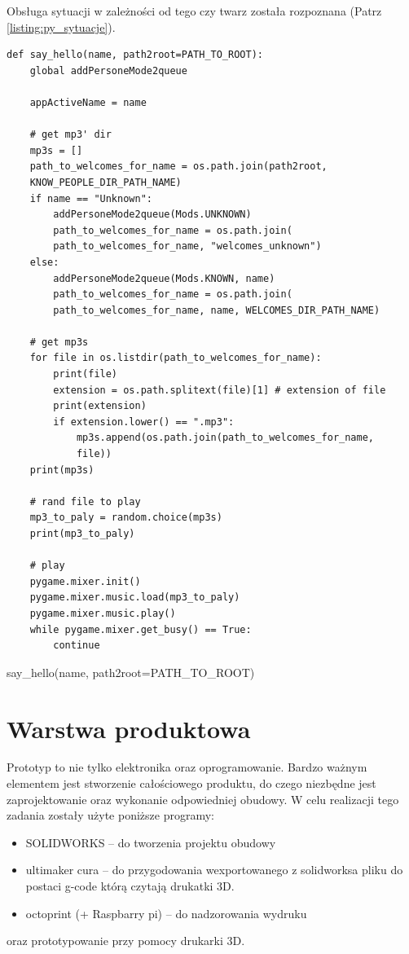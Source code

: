 \documentclass[a4paper,12pt,reqno]{article}
\begin{document}
\newpage
Obsługa sytuacji w zależności od tego czy twarz została rozpoznana  (Patrz \ref{listing:py_sytuacje}).
\begin{listing}[H]%
\begin{mdframed}[backgroundcolor=codebg]
\begin{verbatim}
def say_hello(name, path2root=PATH_TO_ROOT):
    global addPersoneMode2queue
    
    appActiveName = name
    
    # get mp3' dir
    mp3s = []
    path_to_welcomes_for_name = os.path.join(path2root, 
    KNOW_PEOPLE_DIR_PATH_NAME)
    if name == "Unknown":
        addPersoneMode2queue(Mods.UNKNOWN)
        path_to_welcomes_for_name = os.path.join(
        path_to_welcomes_for_name, "welcomes_unknown")
    else:
        addPersoneMode2queue(Mods.KNOWN, name)
        path_to_welcomes_for_name = os.path.join(
        path_to_welcomes_for_name, name, WELCOMES_DIR_PATH_NAME)
        
    # get mp3s
    for file in os.listdir(path_to_welcomes_for_name):
        print(file)
        extension = os.path.splitext(file)[1] # extension of file
        print(extension)
        if extension.lower() == ".mp3":
            mp3s.append(os.path.join(path_to_welcomes_for_name, 
            file))
    print(mp3s)        
        
    # rand file to play
    mp3_to_paly = random.choice(mp3s)
    print(mp3_to_paly)
    
    # play      
    pygame.mixer.init()
    pygame.mixer.music.load(mp3_to_paly)
    pygame.mixer.music.play()
    while pygame.mixer.get_busy() == True:
        continue
\end{verbatim}
\end{mdframed}
\caption{say\_hello(name, path2root=PATH\_TO\_ROOT)}
\label{listing:py_sytuacje}
\end{listing}

\newpage
\section{Warstwa produktowa} \label{section:warstwa_produkcyjna} %
Prototyp to nie tylko elektronika oraz oprogramowanie. Bardzo ważnym elementem jest stworzenie całościowego produktu, do czego niezbędne jest zaprojektowanie oraz wykonanie odpowiedniej obudowy. W celu realizacji tego zadania zostały użyte poniższe programy:
\begin{itemize}
\item SOLIDWORKS – do tworzenia projektu obudowy
\item ultimaker cura – do przygodowania wexportowanego z solidworksa pliku do postaci g-code którą czytają drukatki 3D.
\item octoprint (+ Raspbarry pi) – do nadzorowania wydruku
\end{itemize}
oraz prototypowanie przy pomocy drukarki 3D.
\end{document}

